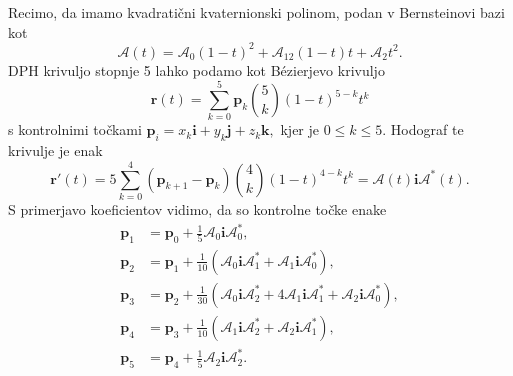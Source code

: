\documentclass[12pt,a4paper,twoside]{article}
\theoremstyle{definition} %
\theoremstyle{plain} %
\theoremstyle{primerstyle}
\numberwithin{equation}{section}  %
\newcommand{\tV}{\mathbf{t}}
\newcommand{\pV}{\mathbf{p}}
\newcommand{\rV}{\mathbf{r}}
\newcommand{\iV}{\mathbf{i}}
\newcommand{\jV}{\mathbf{j}}
\newcommand{\kV}{\mathbf{k}}
\newcommand{\AQ}{\mathcal{A}}
\begin{document}
Recimo, da imamo kvadratični kvaternionski polinom, podan v Bernsteinovi bazi kot
\begin{equation}
	\label{hermite_bernstein_polinom}
	\AQ(t)=\AQ_0(1-t)^2+\AQ_12(1-t)t+\AQ_2t^2.
\end{equation}
DPH krivuljo stopnje 5 lahko podamo kot Bézierjevo krivuljo
\begin{equation}
	\label{hermite_bezier_krivulja}
	\rV(t)=\sum_{k=0}^5\pV_k\binom{5}{k}(1-t)^{5-k}t^k
\end{equation}
s kontrolnimi točkami $\pV_i=x_k\iV+y_k\jV+z_k\kV,$ kjer je $0\leq k\leq5.$ Hodograf te krivulje je enak
\begin{equation}
	\label{hermite_hodograf}
	\rV'(t)=5\sum_{k=0}^4(\pV_{k+1}-\pV_k)\binom{4}{k}(1-t)^{4-k}t^k=\AQ(t)\iV\AQ^*(t).
\end{equation}
S primerjavo koeficientov vidimo, da so kontrolne točke enake
\begin{align}
	\label{hermit_kontrolne}
	\pV_1&=\pV_0+\frac{1}{5}\AQ_0\iV\AQ_0^*,\nonumber\\
	\pV_2&=\pV_1+\frac{1}{10}(\AQ_0\iV\AQ_1^*+\AQ_1\iV\AQ_0^*),\nonumber\\
	\pV_3&=\pV_2+\frac{1}{30}(\AQ_0\iV\AQ_2^*+4\AQ_1\iV\AQ_1^*+\AQ_2\iV\AQ_0^*),\\
	\pV_4&=\pV_3+\frac{1}{10}(\AQ_1\iV\AQ_2^*+\AQ_2\iV\AQ_1^*),\nonumber\\
	\pV_5&=\pV_4+\frac{1}{5}\AQ_2\iV\AQ_2^*.\nonumber
\end{align}
\end{document}

